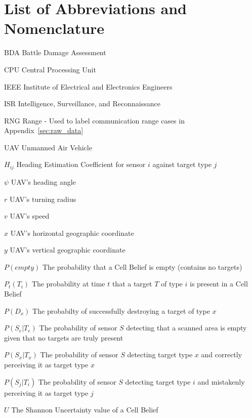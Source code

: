 \chapter*{List of Abbreviations and Nomenclature}
\begin{abbrv}
\item[BDA]				Battle Damage Assessment
\item[CPU]				Central Processing Unit
\item[IEEE]				Institute of Electrical and Electronics Engineers
\item[ISR]              Intelligence, Surveillance, and Reconnaissance
\item[RNG]              Range - Used to label communication range cases in Appendix~\ref{sec:raw_data}
\item[UAV]				Unmanned Air Vehicle
\item[$H_{ij}$] 		Heading Estimation Coefficient for sensor $i$ against target type $j$
\item[$\psi$]           UAV's heading angle
\item[$r$]              UAV's turning radius
\item[$v$] 				UAV's speed
\item[$x$]			    UAV's horizontal geographic coordinate
\item[$y$]			    UAV's vertical geographic coordinate
\item[$P(empty)$] 		The probability that a Cell Belief is empty (contains no targets)
\item[$P_{t}(T_{i})$]   The probability at time $t$ that a target $T$ of type $i$ is present in a Cell Belief
\item[$P(D_{x})$]       The probabilty of successfully destroying a target of type $x$
\item[$P(S_{e}|T_{e})$] The probability of sensor $S$ detecting that a scanned area is empty given that no targets are truly present
\item[$P(S_{x}|T_{x})$] The probability of sensor $S$ detecting target type $x$ and correctly perceiving it as target type $x$
\item[$P(S_{j}|T_{i})$] The probability of sensor $S$ detecting target type $i$ and mistakenly perceiving it as target type $j$
\item[$U$]              The Shannon Uncertainty value of a Cell Belief
\end{abbrv}